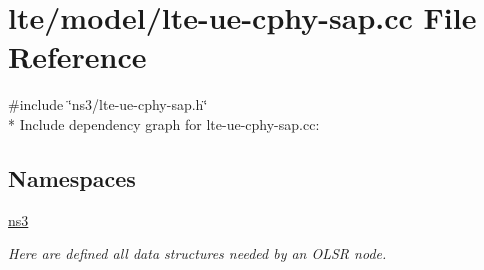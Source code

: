 \hypertarget{lte-ue-cphy-sap_8cc}{}\section{lte/model/lte-\/ue-\/cphy-\/sap.cc File Reference}
\label{lte-ue-cphy-sap_8cc}
{\ttfamily \#include \char`\"{}ns3/lte-\/ue-\/cphy-\/sap.\+h\char`\"{}}\\*
Include dependency graph for lte-\/ue-\/cphy-\/sap.cc\+:
\subsection*{Namespaces}
\begin{DoxyCompactItemize}
\item 
 \hyperlink{namespacens3}{ns3}
\begin{DoxyCompactList}\small\item\em Here are defined all data structures needed by an O\+L\+SR node. \end{DoxyCompactList}\end{DoxyCompactItemize}
